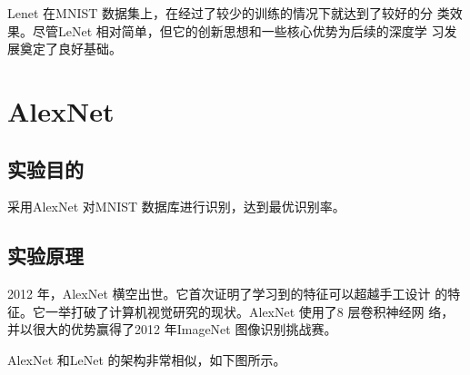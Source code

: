 \documentclass[a4paper,12pt]{article}
\begin{document}
Lenet 在MNIST 数据集上，在经过了较少的训练的情况下就达到了较好的分
类效果。尽管LeNet 相对简单，但它的创新思想和一些核心优势为后续的深度学
习发展奠定了良好基础。

\newpage
\section{AlexNet}
\subsection{实验目的}
采用AlexNet 对MNIST 数据库进行识别，达到最优识别率。

\subsection{实验原理}
2012 年，AlexNet 横空出世。它首次证明了学习到的特征可以超越手工设计
的特征。它一举打破了计算机视觉研究的现状。AlexNet 使用了8 层卷积神经网
络，并以很大的优势赢得了2012 年ImageNet 图像识别挑战赛。

AlexNet 和LeNet 的架构非常相似，如下图所示。
\end{document}

